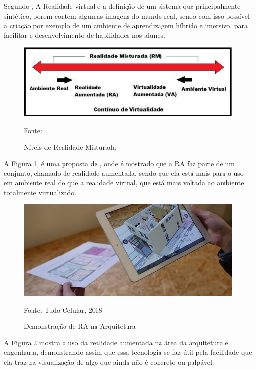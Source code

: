 	Segundo , A Realidade virtual é a definição de um sistema que principalmente sintético, porem contem algumas imagens do mundo real, sendo com isso possível a criação por exemplo de um ambiente de aprendizagem híbrido e imersivo, para facilitar o desenvolvimento de habilidades nos alunos. 
	
	
	\begin{figure}[H]
		\centering
		\includegraphics[scale=1]{imagens/misturada}
		\caption{Níveis de Realidade Misturada}
		Fonte: 
		\label{fig:misturada}
	\end{figure}
	
	A Figura \ref{fig:misturada}, é uma proposta de , onde é mostrado que a RA faz parte de um conjunto, chamado de realidade aumentada, sendo que ela está mais para o uso em ambiente real do que a realidade virtual, que está mais voltada ao ambiente totalmente virtualizado.

	\begin{figure}[H]
		\centering
		\includegraphics[scale=0.7]{imagens/raarqui}
		\caption{Demonstração de RA na Arquitetura}
		Fonte: Tudo Celular, 2018
		\label{fig:arquitetura}
	\end{figure}
	
	A Figura \ref{fig:arquitetura} mostra o uso da realidade aumentada na área da arquitetura e engenharia, demonstrando assim que essa tecnologia se faz útil pela facilidade que ela traz na visualização de algo que ainda não é concreto ou palpável.
	
